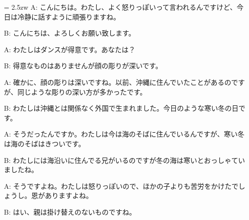 \documentclass[11pt]{amsart}
\title{}
\author{}
\newenvironment{hangall}[1]{\hangindent = 2.5zw\everypar{\hangindent = 2.5zw}}{}
\begin{document}
\maketitle
\begin{hangall}{}%
A: こんにちは。わたし、よく怒りっぽいって言われるんですけど、今日は冷静に話すように頑張りますね。



B: こんにちは、よろしくお願い致します。



A: わたしはダンスが得意です。あなたは？



B: 得意なものはありませんが顔の彫りが深いです。



A: 確かに、顔の彫りは深いですね。以前、沖縄に住んでいたことがあるのですが、同じような彫りの深い方が多かったです。



B: わたしは沖縄とは関係なく外国で生まれました。今日のような寒い冬の日です。



A: そうだったんですか。わたしは今は海のそばに住んでいるんですが、寒い冬は海のそばはきついです。



B: わたしには海沿いに住んでる兄がいるのですが冬の海は寒いとおっしゃていましたね。



A: そうですよね。わたしは怒りっぽいので、ほかの子よりも苦労をかけたでしょうし。恩がありますよね。



B: はい、親は掛け替えのないものですね。\end{hangall}
\end{document}
